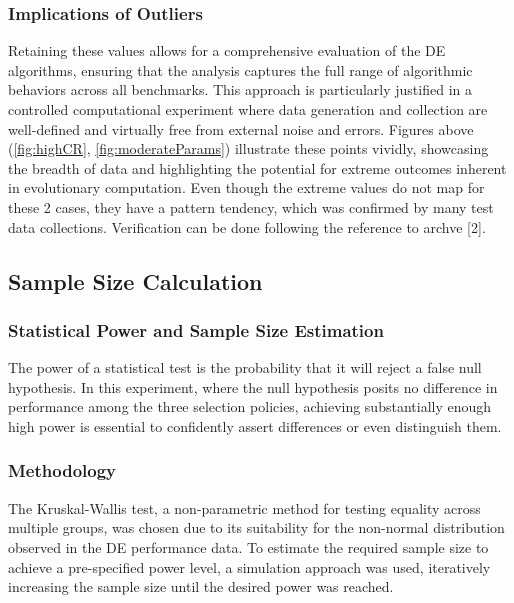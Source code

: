 \documentclass[12pt,a4paper]{article}
\begin{document}
\subsubsection{Implications of Outliers}
Retaining these values allows for a comprehensive evaluation of the DE algorithms, ensuring that the analysis captures the full range of algorithmic behaviors across all benchmarks. This approach is particularly justified in a controlled computational experiment where data generation and collection are well-defined and virtually free from external noise and errors. Figures above (\ref{fig:highCR}, \ref{fig:moderateParams}) illustrate these points vividly, showcasing the breadth of data and highlighting the potential for extreme outcomes inherent in evolutionary computation. Even though the extreme values do not map for these 2 cases, they have a pattern tendency, which was confirmed by many test data collections. Verification can be done following the reference to archve [2].

\subsection{Sample Size Calculation}
\label{subsec:sample-size}

\subsubsection{Statistical Power and Sample Size Estimation}
The power of a statistical test is the probability that it will reject a false null hypothesis. In this experiment, where the null hypothesis posits no difference in performance among the three selection policies, achieving substantially enough high power is essential to confidently assert differences or even distinguish them.

\subsubsection{Methodology}
The Kruskal-Wallis test, a non-parametric method for testing equality across multiple groups, was chosen due to its suitability for the non-normal distribution observed in the DE performance data. To estimate the required sample size to achieve a pre-specified power level, a simulation approach was used, iteratively increasing the sample size until the desired power was reached.
\end{document}

